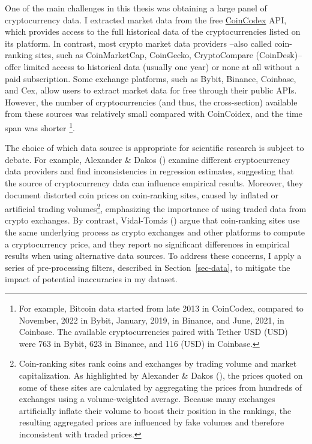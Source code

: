 \documentclass[
  12pt,
  a4paper,
  openany]{scrbook}
\begin{document}
One of the main challenges in this thesis was obtaining a large panel of
cryptocurrency data. I extracted market data from the free
\href{https://coincodex.com/}{CoinCodex} API, which provides access to
the full historical data of the cryptocurrencies listed on its platform.
In contrast, most crypto market data providers --also called
coin-ranking sites, such as CoinMarketCap, CoinGecko, CryptoCompare
(CoinDesk)-- offer limited access to historical data (usually one year)
or none at all without a paid subscription. Some exchange platforms,
such as Bybit, Binance, Coinbase, and Cex, allow users to extract market
data for free through their public APIs. However, the number of
cryptocurrencies (and thus, the cross-section) available from these
sources was relatively small compared with CoinCoidex, and the time span
was shorter \footnote{For example, Bitcoin data started from late 2013
  in CoinCodex, compared to November, 2022 in Bybit, January, 2019, in
  Binance, and June, 2021, in Coinbase. The available cryptocurrencies
  paired with Tether USD (USD) were 763 in Bybit, 623 in Binance, and
  116 (USD) in Coinbase.}.

The choice of which data source is appropriate for scientific research
is subject to debate. For example, Alexander \& Dakos
() examine
different cryptocurrency data providers and find inconsistencies in
regression estimates, suggesting that the source of cryptocurrency data
can influence empirical results. Moreover, they document distorted coin
prices on coin-ranking sites, caused by inflated or artificial trading
volumes\footnote{Coin-ranking sites rank coins and exchanges by trading
  volume and market capitalization. As highlighted by Alexander \& Dakos
  (), the prices
  quoted on some of these sites are calculated by aggregating the prices
  from hundreds of exchanges using a volume-weighted average. Because
  many exchanges artificially inflate their volume to boost their
  position in the rankings, the resulting aggregated prices are
  influenced by fake volumes and therefore inconsistent with traded
  prices.}, emphasizing the importance of using traded data from crypto
exchanges. By contrast, Vidal-Tomás
() argue that
coin-ranking sites use the same underlying process as crypto exchanges
and other platforms to compute a cryptocurrency price, and they report
no significant differences in empirical results when using alternative
data sources. To address these concerns, I apply a series of
pre-processing filters, described in Section~\ref{sec-data}, to mitigate
the impact of potential inaccuracies in my dataset.
\end{document}

